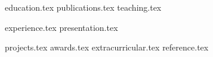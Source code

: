\documentclass[letterpaper,11pt]{article}
\begin{document}


{education.tex}
{publications.tex}
{teaching.tex}

{experience.tex}
{presentation.tex}

{projects.tex}
{awards.tex}
{extracurricular.tex}
{reference.tex}

\end{document}
